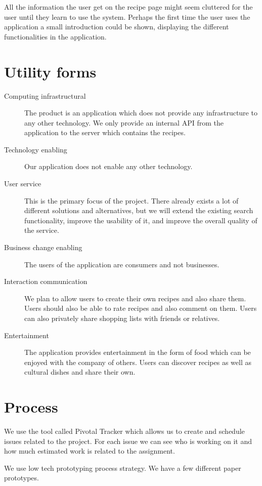 All the information the user get on the recipe page might seem cluttered for the user until they learn to use the system. Perhaps the first time the user uses the application a small introduction could be shown, displaying the different functionalities in the application.



\section*{Utility forms}

\begin{description}
\item[Computing infrastructural] The product is an application which does not provide any infrastructure to any other technology. We only provide an internal API from the application to the server which contains the recipes.
\item[Technology enabling] Our application does not enable any other technology.
\item[User service] This is the primary focus of the project. There already exists a lot of different solutions and alternatives, but we will extend the existing search functionality, improve the usability of it, and improve the overall quality of the service.
\item[Business change enabling] The users of the application are consumers and not businesses.
\item[Interaction communication] We plan to allow users to create their own recipes and also share them. Users should also be able to rate recipes and also comment on them. Users can also privately share shopping lists with friends or relatives.
\item[Entertainment] The application provides entertainment in the form of food which can be enjoyed with the company of others. Users can discover recipes as well as cultural dishes and share their own.
\end{description}

\section*{Process}

We use the tool called Pivotal Tracker which allows us to create and schedule issues related to the project. For each issue we can see who is working on it and how much estimated work is related to the assignment.

We use low tech prototyping process strategy. We have a few different paper prototypes.

